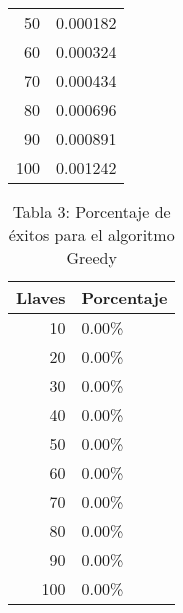 \documentclass[a4paper]{article}
\begin{document}
\begin{center}
\begin{table}[ht]
\begin{tabular}{r|l}
50&0.000182\\
60&0.000324\\
70&0.000434\\
80&0.000696\\
90&0.000891\\
100&0.001242\\
\end{tabular}
\end{table}
\begin{table}[ht]
\centering
\caption*{Tabla 3: Porcentaje de \'exitos para el algoritmo Greedy}
\label{4}
\begin{tabular}{r|l}
Llaves & Porcentaje \\ \hline
10&0.00\%\\
20&0.00\%\\
30&0.00\%\\
40&0.00\%\\
50&0.00\%\\
60&0.00\%\\
70&0.00\%\\
80&0.00\%\\
90&0.00\%\\
100&0.00\%\\
\end{tabular}
\end{table}
\end{center}
\end{document}
